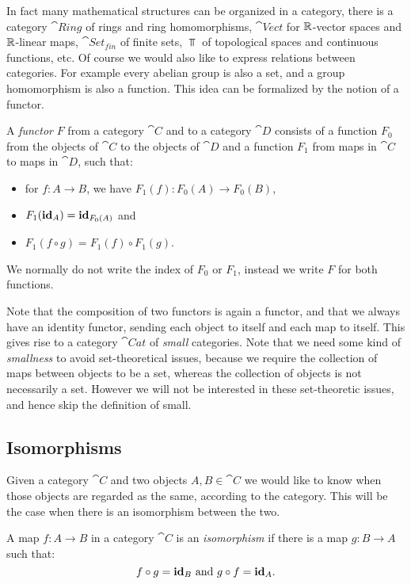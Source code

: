In fact many mathematical structures can be organized in a category, there is a category $\cat{Ring}$ of rings and ring homomorphisms, $\cat{Vect}$ for $\mathbb{R}$-vector spaces and $\mathbb{R}$-linear maps, $\cat{Set_{fin}}$ of finite sets, $\Top$ of topological spaces and continuous functions, etc. Of course we would also like to express relations between categories. For example every abelian group is also a set, and a group homomorphism is also a function. This idea can be formalized by the notion of a functor.

\begin{definition}
	A \emph{functor} $F$ from a category $\cat{C}$ and to a category $\cat{D}$ consists of a function $F_0$ from the objects of $\cat{C}$ to the objects of $\cat{D}$ and a function $F_1$ from maps in $\cat{C}$ to maps in $\cat{D}$, such that:
	\begin{itemize}
		\item for $f: A \to B$, we have $F_1(f): F_0(A) \to F_0(B)$,
		\item $F_1(\mathbf{id}_A) = \mathbf{id}_{F_0(A)}$ and
		\item $F_1(f \circ g) = F_1(f) \circ F_1(g)$.
	\end{itemize}
	We normally do not write the index of $F_0$ or $F_1$, instead we write $F$ for both functions.
\end{definition}

Note that the composition of two functors is again a functor, and that we always have an identity functor, sending each object to itself and each map to itself. This gives rise to a category $\cat{Cat}$ of \emph{small} categories. Note that we need some kind of \emph{smallness} to avoid set-theoretical issues, because we require the collection of maps between objects to be a set, whereas the collection of objects is not necessarily a set. However we will not be interested in these set-theoretic issues, and hence skip the definition of small.

\subsection{Isomorphisms}
Given a category $\cat{C}$ and two objects $A, B \in \cat{C}$ we would like to know when those objects are regarded as the same, according to the category. This will be the case when there is an isomorphism between the two.

\begin{definition}
	A map $f: A \to B$ in a category $\cat{C}$ is an \emph{isomorphism} if there is a map $g: B \to A$ such that:
	$$ f \circ g = \mathbf{id}_B \text{ and } g \circ f = \mathbf{id}_A.$$
\end{definition}

